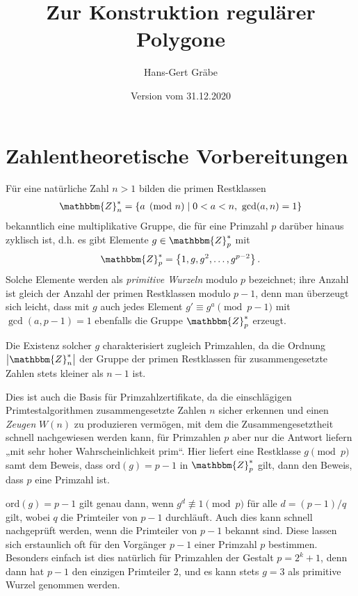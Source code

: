 \documentclass[11pt]{article}
\author{Hans-Gert Gräbe}
\title{Zur Konstruktion regulärer Polygone}
\date{Version vom 31.12.2020}
\newcommand{\cbr}[1]{\ensuremath{\left\{#1\right\}}}
\newcommand{\Z}{\mathbbm{Z}}
\begin{document}
 
\maketitle         

\section{Zahlentheoretische Vorbereitungen}

Für eine natürliche Zahl $n>1$ bilden die primen Restklassen
\begin{gather*}
  \Z_n^\ast=\cbr{a \pmod n \mid 0<a<n,\ \gcd(a,n)=1}
\end{gather*}
bekanntlich eine multiplikative Gruppe, die für eine Primzahl $p$ darüber
hinaus zyklisch ist, d.h. es gibt Elemente $g\in \Z_p^\ast$ mit
\begin{gather*}
  \Z_p^\ast=\cbr{1,g,g^2,\dots,g^{p-2}}.
\end{gather*}
Solche Elemente werden als \emph{primitive Wurzeln} modulo $p$ bezeichnet;
ihre Anzahl ist gleich der Anzahl der primen Restklassen modulo $p-1$, denn
man überzeugt sich leicht, dass mit $g$ auch jedes Element $g'\equiv g^a
\pmod{p-1}$ mit $\gcd(a,p-1)=1$ ebenfalls die Gruppe $\Z_p^\ast$ erzeugt.

Die Existenz solcher $g$ charakterisiert zugleich Primzahlen, da die Ordnung
$\left|\Z_n^\ast\right|$ der Gruppe der primen Restklassen für
zusammengesetzte Zahlen stets kleiner als $n-1$ ist.

Dies ist auch die Basis für Primzahlzertifikate, da die einschlägigen
Primtestalgorithmen zusammengesetzte Zahlen $n$ sicher erkennen und einen
\emph{Zeugen} $W(n)$ zu produzieren vermögen, mit dem die Zusammengesetztheit
schnell nachgewiesen werden kann, für Primzahlen $p$ aber nur die Antwort
liefern „mit sehr hoher Wahrscheinlichkeit prim“. Hier liefert eine Restklasse
$g \pmod p$ samt dem Beweis, dass $\mathrm{ord}(g)=p-1$ in $\Z_p^\ast$ gilt,
dann den Beweis, dass $p$ eine Primzahl ist.

$\mathrm{ord}(g)=p-1$ gilt genau dann, wenn $g^d\not\equiv 1\pmod p$ für alle
$d=(p-1)/q$ gilt, wobei $q$ die Primteiler von $p-1$ durchläuft. Auch dies
kann schnell nachgeprüft werden, wenn die Primteiler von $p-1$ bekannt sind.
Diese lassen sich erstaunlich oft für den Vorgänger $p-1$ einer Primzahl $p$
bestimmen. Besonders einfach ist dies natürlich für Primzahlen der Gestalt
$p=2^k+1$, denn dann hat $p-1$ den einzigen Primteiler $2$, und es kann stets
$g=3$ als primitive Wurzel genommen werden. 
\end{document}
